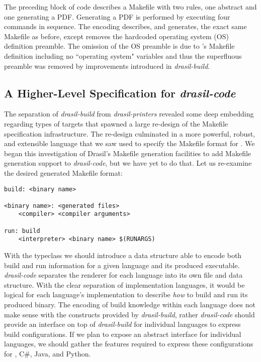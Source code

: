 {{{{{%

The preceding block of code describes a Makefile with two rules, one abstract and one generating a PDF. Generating a PDF is performed by executing four commands in sequence. The encoding describes, and generates, the exact same Makefile as before, except removes the hardcoded operating system (OS) definition preamble. The omission of the OS preamble is due to 's Makefile definition including no ``operating system" variables and thus the superfluous preamble was removed by improvements introduced in \textit{drasil-build}.

\subsection{A Higher-Level Specification for \textit{drasil-code}}\label{bsDCode}

The separation of \textit{drasil-build} from \textit{drasil-printers} revealed some deep embedding regarding types of targets that spawned a large re-design of the Makefile specification infrastructure. The re-design culminated in a more powerful, robust, and extensible language that we saw used to specify the Makefile format for . We began this investigation of Drasil's Makefile generation facilities to add Makefile generation support to \textit{drasil-code}, but we have yet to do that. Let us re-examine the desired generated Makefile format:

\begin{tcolorbox}[breakable, toprule at break=0pt, bottomrule at break=0pt]
\begin{verbatim}
build: <binary name>

<binary name>: <generated files>
	<compiler> <compiler arguments>

run: build
	<interpreter> <binary name> $(RUNARGS)
\end{verbatim}
\end{tcolorbox}

With the  typeclass we should introduce a data structure able to encode both build and run information for a given language and its produced executable. \textit{drasil-code} separates the renderer for each language into its own file and data structure. With the clear separation of implementation languages, it would be logical for each language's implementation to describe \textit{how} to build and run its produced binary. The encoding of build knowledge within each language does not make sense with the constructs provided by \textit{drasil-build}, rather \textit{drasil-code} should provide an interface on top of \textit{drasil-build} for individual languages to express build configurations. If we plan to expose an abstract interface for individual languages, we should gather the features required to express these configurations for \CC, C\#, Java, and Python. 

}}}}}
